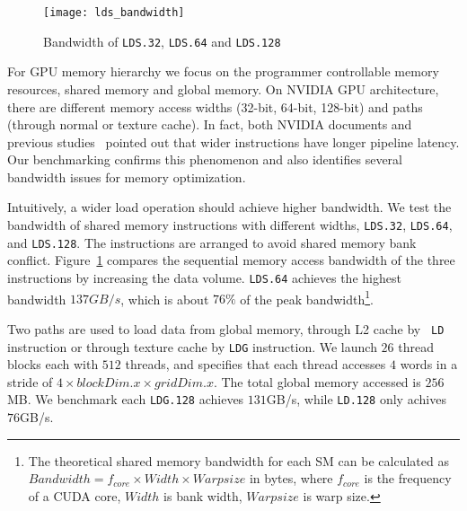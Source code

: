 \begin{figure}[htbp]
\begin{center}
\texttt{[image: lds\_bandwidth]}
    \caption{ Bandwidth of {\tt LDS.32}, {\tt LDS.64} and {\tt LDS.128}}
\label{fig:lds_bw}
\end{center}
\end{figure}

For GPU memory hierarchy we focus on the programmer controllable memory resources, shared memory and global memory.
On NVIDIA GPU architecture, there are different memory access widths (32-bit, 64-bit, 128-bit) and paths (through normal or texture cache).
In fact, both NVIDIA documents and previous studies~\cite{tan} pointed out that wider
instructions have longer pipeline latency.
Our benchmarking confirms this phenomenon and also identifies several bandwidth issues for memory optimization.

Intuitively, a wider load operation should achieve higher bandwidth.
We test the bandwidth of shared memory instructions with different widths, {\tt LDS.32}, {\tt LDS.64},
and {\tt LDS.128}.
The instructions are arranged to avoid shared memory bank conflict.
Figure~\ref{fig:lds_bw} compares the sequential memory access bandwidth of the three instructions by increasing the data volume.
{\tt LDS.64} achieves the highest bandwidth $137GB/s$, which is about $76\%$ of the peak bandwidth\footnote{The
theoretical shared memory bandwidth for each SM can be calculated as $Bandwidth = f_{core} \times Width \times Warpsize$ in
bytes, where $f_{core}$ is the frequency of a CUDA core, $Width$ is bank width, $Warpsize$ is warp size.}.

Two paths are used to load data from global memory, through L2 cache by {\tt
LD} instruction or through texture cache by {\tt LDG} instruction.
We launch $26$ thread blocks each with $512$ threads, and specifies that each thread accesses $4$ words in a stride of $4 \times blockDim.x \times gridDim.x$.
The total global memory accessed is $256$MB.
We benchmark each {\tt LDG.128} achieves $131$GB/s, while {\tt LD.128} only achives $76$GB/s.

